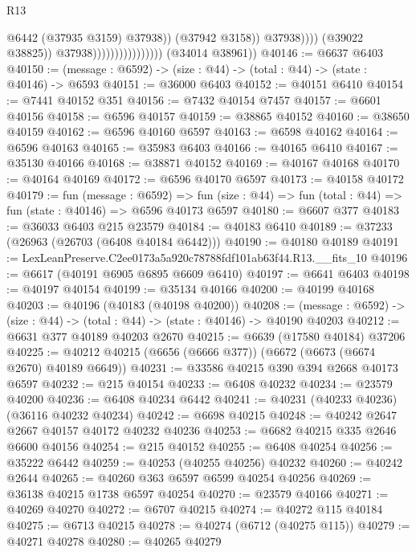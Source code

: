 \begin{lexlean}{R13}
\begin{coremodule}
                                                      @6442
                                                      (@37935 @3159)
                                                      @37938))
                                                  (@37942 @3158))
                                                @37938))))
                                        (@39022 @38825))
                                      @37938))))))))))))))))
      (@34014 @38961))
@40146 := @6637 @6403
@40150 := (message : @6592) -> (size : @44) -> (total : @44) -> (state : @40146) -> @6593
@40151 := @36000 @6403
@40152 := @40151 @6410
@40154 := @7441 @40152 @351
@40156 := @7432 @40154 @7457
@40157 := @6601 @40156
@40158 := @6596 @40157
@40159 := @38865 @40152
@40160 := @38650 @40159
@40162 := @6596 @40160 @6597
@40163 := @6598 @40162
@40164 := @6596 @40163
@40165 := @35983 @6403
@40166 := @40165 @6410
@40167 := @35130 @40166
@40168 := @38871 @40152
@40169 := @40167 @40168
@40170 := @40164 @40169
@40172 := @6596 @40170 @6597
@40173 := @40158 @40172
@40179 := fun (message : @6592) =>
  fun (size : @44) => fun (total : @44) => fun (state : @40146) => @6596 @40173 @6597
@40180 := @6607 @377
@40183 := @36033 @6403 @215 @23579
@40184 := @40183 @6410
@40189 := @37233 (@26963 (@26703 (@6408 @40184 @6442)))
@40190 := @40180 @40189
@40191 := LexLeanPreserve.C2ee0173a5a920c78788fdf101ab63f44.R13.__fits_10
@40196 := @6617 (@40191 @6905 @6895 @6609 @6410)
@40197 := @6641 @6403
@40198 := @40197 @40154
@40199 := @35134 @40166
@40200 := @40199 @40168
@40203 := @40196 (@40183 (@40198 @40200))
@40208 := (message : @6592) -> (size : @44) -> (total : @44) -> (state : @40146) -> @40190 @40203
@40212 := @6631 @377 @40189 @40203 @2670
@40215 := @6639 (@17580 @40184) @37206
@40225 := @40212 @40215 (@6656 (@6666 @377)) (@6672 (@6673 (@6674 @2670) @40189 @6649))
@40231 := @33586 @40215 @390 @394 @2668 @40173 @6597
@40232 := @215 @40154
@40233 := @6408 @40232
@40234 := @23579 @40200
@40236 := @6408 @40234 @6442
@40241 := @40231 (@40233 @40236) (@36116 @40232 @40234)
@40242 := @6698 @40215
@40248 := @40242 @2647 @2667 @40157 @40172 @40232 @40236
@40253 := @6682 @40215 @335 @2646 @6600 @40156
@40254 := @215 @40152
@40255 := @6408 @40254
@40256 := @35222 @6442
@40259 := @40253 (@40255 @40256) @40232
@40260 := @40242 @2644
@40265 := @40260 @363 @6597 @6599 @40254 @40256
@40269 := @36138 @40215 @1738 @6597 @40254
@40270 := @23579 @40166
@40271 := @40269 @40270
@40272 := @6707 @40215
@40274 := @40272 @115 @40184
@40275 := @6713 @40215
@40278 := @40274 (@6712 (@40275 @115))
@40279 := @40271 @40278
@40280 := @40265 @40279

\end{coremodule}
\end{lexlean}
